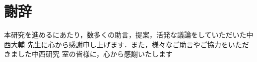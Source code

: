\newpage
\section{謝辞}
本研究を進めるにあたり，数多くの助言，提案，活発な議論をしていただいた中西大輔
先生に心から感謝申し上げます．また，様々なご助言やご協力をいただきました中西研究
室の皆様に，心から感謝いたします